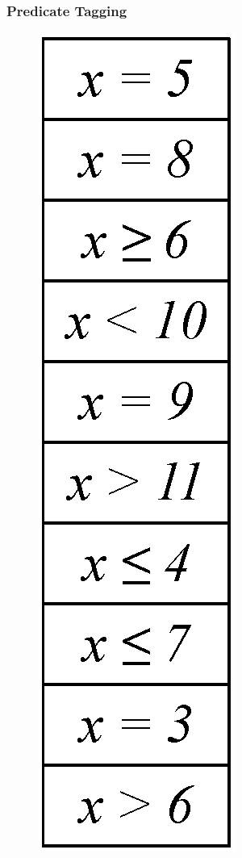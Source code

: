 \documentclass[mathserif,14pt,xcolor=table]{beamer}
\begin{document}
\begin{frame}
    \frametitle{Predicate Tagging}
     {
        \begin{figure}[ht!]
            \centering
            \includegraphics[scale=0.50]{fig/tag_exp_1.eps}

\end{figure}}
\end{frame}
\end{document}
